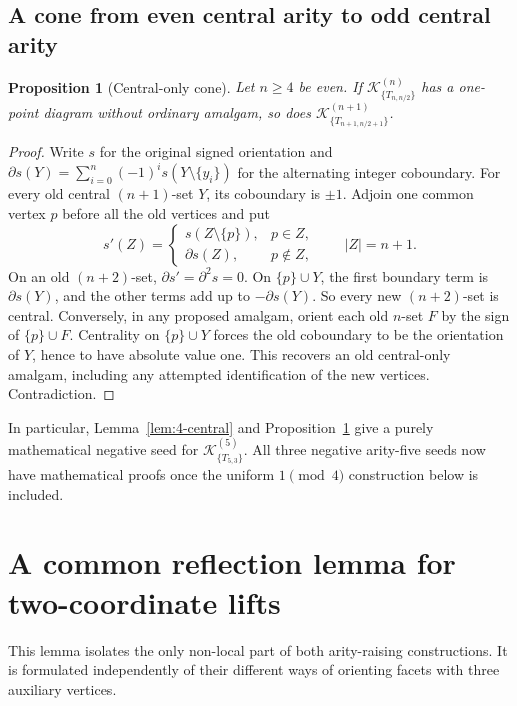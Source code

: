 \documentclass[11pt,a4paper]{article}
\newtheorem{proposition}[theorem]{Proposition}
\theoremstyle{remark}
\newcommand{\K}{\mathcal K}
\begin{document}
\subsection{A cone from even central arity to odd central arity}
\begin{proposition}[Central-only cone]\label{prop:cone}
Let $n\ge4$ be even.  If $\K^{(n)}_{\{T_{n,n/2}\}}$ has a
one-point diagram without ordinary amalgam, so does
$\K^{(n+1)}_{\{T_{n+1,n/2+1}\}}$.
\end{proposition}
\begin{proof}
Write $s$ for the original signed orientation and
$\partial s(Y)=\sum_{i=0}^{n}(-1)^is(Y\setminus\{y_i\})$
for the alternating integer coboundary.  For every old central
$(n+1)$-set $Y$, its coboundary is $\pm1$.
Adjoin one common vertex $p$ before all the old vertices and put
\[
 s'(Z)=\begin{cases}
 s(Z\setminus\{p\}),&p\in Z,\\
 \partial s(Z),&p\notin Z,
 \end{cases}\qquad |Z|=n+1.
\]
On an old $(n+2)$-set, $\partial s'=\partial^2s=0$.
On $\{p\}\cup Y$, the first boundary term is $\partial s(Y)$,
and the other terms add up to $-\partial s(Y)$.
So every new $(n+2)$-set is central.
Conversely, in any proposed amalgam, orient each old $n$-set
$F$ by the sign of $\{p\}\cup F$.  Centrality on
$\{p\}\cup Y$ forces the old coboundary to be the orientation
of $Y$, hence to have absolute value one.  This recovers an old
central-only amalgam, including any attempted identification of the
new vertices.  Contradiction.
\end{proof}

In particular, Lemma~\ref{lem:4-central} and
Proposition~\ref{prop:cone} give a purely mathematical negative
seed for $\K^{(5)}_{\{T_{5,3}\}}$.  All three negative
arity-five seeds now have mathematical proofs once the uniform
$1\pmod4$ construction below is included.


\section{A common reflection lemma for two-coordinate lifts}
\label{sec:reflection}
This lemma isolates the only non-local part of both arity-raising
constructions. It is formulated independently of their different
ways of orienting facets with three auxiliary vertices.
\end{document}

